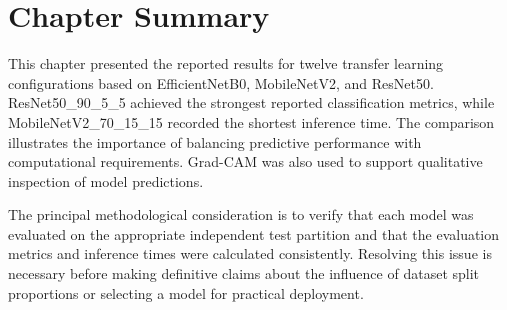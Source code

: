 \section{Chapter Summary}

This chapter presented the reported results for twelve transfer learning configurations based on EfficientNetB0, MobileNetV2, and ResNet50. ResNet50\_90\_5\_5 achieved the strongest reported classification metrics, while MobileNetV2\_70\_15\_15 recorded the shortest inference time. The comparison illustrates the importance of balancing predictive performance with computational requirements. Grad-CAM was also used to support qualitative inspection of model predictions.

The principal methodological consideration is to verify that each model was evaluated on the appropriate independent test partition and that the evaluation metrics and inference times were calculated consistently. Resolving this issue is necessary before making definitive claims about the influence of dataset split proportions or selecting a model for practical deployment.